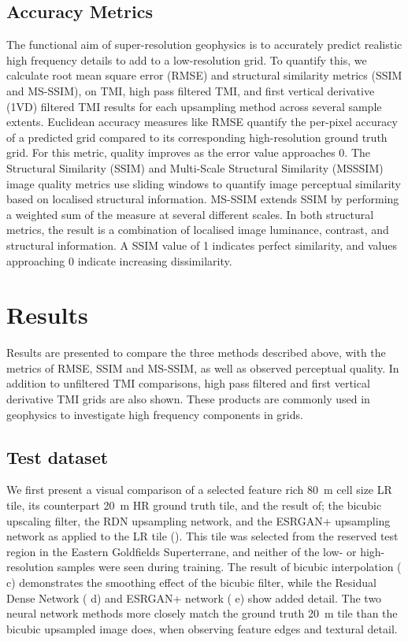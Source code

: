 \documentclass[manuscript.tex]{subfiles}
\begin{document}
\subsection{Accuracy Metrics}
The functional aim of super-resolution geophysics is to accurately predict realistic high frequency details to add to a low-resolution grid.
To quantify this, we calculate root mean square error (RMSE) and structural similarity metrics (SSIM and MS-SSIM), on TMI, high pass filtered TMI, and first vertical derivative (1VD) filtered TMI results for each upsampling method across several sample extents.
Euclidean accuracy measures like RMSE quantify the per-pixel accuracy of a predicted grid compared to its corresponding high-resolution ground truth grid.
For this metric, quality improves as the error value approaches \num{0}.
The Structural Similarity (SSIM) \parencite{wangImageQualityAssessment2004} and Multi-Scale Structural Similarity (MSSSIM) \parencite{wangMultiscaleStructuralSimilarity2003} image quality metrics use sliding windows to quantify image perceptual similarity based on localised structural information.
MS-SSIM extends SSIM by performing a weighted sum of the measure at several different scales.
In both structural metrics, the result is a combination of localised image luminance, contrast, and structural information.
A SSIM value of 1 indicates perfect similarity, and values approaching \num{0} indicate increasing dissimilarity.

\section{Results}
Results are presented to compare the three methods described above, with the metrics of RMSE, SSIM and MS-SSIM, as well as observed perceptual quality.
In addition to unfiltered TMI comparisons, high pass filtered and first vertical derivative TMI grids are also shown.
These products are commonly used in geophysics to investigate high frequency components in grids.

\subsection{Test dataset}
We first present a visual comparison of a selected feature rich \qty{80}{\metre} cell size LR tile, its counterpart \qty{20}{\metre} HR ground truth tile, and the result of; the bicubic upscaling filter, the RDN\textdaggerdbl{} upsampling network, and the ESRGAN+ upsampling network as applied to the LR tile ().
This tile was selected from the reserved test region in the Eastern Goldfields Superterrane, and neither of the low- or high-resolution samples were seen during training.
The result of bicubic interpolation ( c) demonstrates the smoothing effect of the bicubic filter, while the Residual Dense Network ( d) and ESRGAN+ network ( e) show added detail.
The two neural network methods more closely match the ground truth \qty{20}{\metre} tile than the bicubic upsampled image does, when observing feature edges and textural detail.
\end{document}
